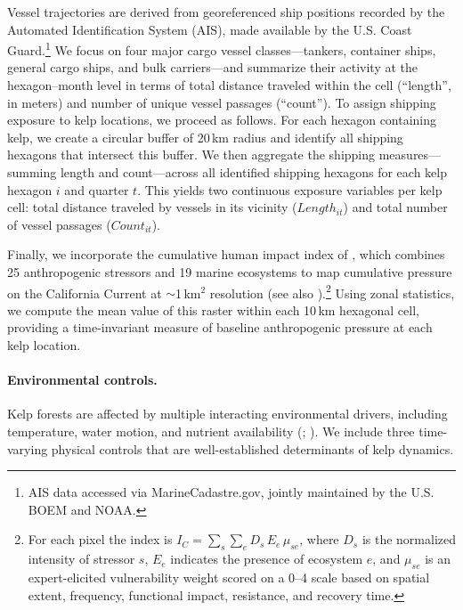 \documentclass[12pt]{article}
\begin{document}
Vessel trajectories are derived from georeferenced ship positions recorded by the Automated Identification System (AIS), made available by the U.S. Coast Guard.\footnote{AIS data accessed via MarineCadastre.gov, jointly maintained by the U.S. BOEM and NOAA.} We focus on four major cargo vessel classes---tankers, container ships, general cargo ships, and bulk carriers---and summarize their activity at the hexagon--month level in terms of total distance traveled within the cell (``length'', in meters) and number of unique vessel passages (``count''). To assign shipping exposure to kelp locations, we proceed as follows. For each hexagon containing kelp, we create a circular buffer of 20\,km radius and identify all shipping hexagons that intersect this buffer. We then aggregate the shipping measures---summing length and count---across all identified shipping hexagons for each kelp hexagon $i$ and quarter $t$. This yields two continuous exposure variables per kelp cell: total distance traveled by vessels in its vicinity ($Length_{it}$) and total number of vessel passages ($Count_{it}$).

Finally, we incorporate the cumulative human impact index of \citet{Halpern2009}, which combines 25 anthropogenic stressors and 19 marine ecosystems to map cumulative pressure on the California Current at ${\sim}$1\,km$^{2}$ resolution (see also \citealp{Maxwell2013}).\footnote{For each pixel the index is $I_{C}=\sum_{s}\sum_{e}D_{s}\,E_{e}\,\mu_{se}$, where $D_{s}$ is the normalized intensity of stressor $s$, $E_{e}$ indicates the presence of ecosystem $e$, and $\mu_{se}$ is an expert-elicited vulnerability weight scored on a 0--4 scale based on spatial extent, frequency, functional impact, resistance, and recovery time.} Using zonal statistics, we compute the mean value of this raster within each 10\,km hexagonal cell, providing a time-invariant measure of baseline anthropogenic pressure at each kelp location.

\paragraph{Environmental controls.}
Kelp forests are affected by multiple interacting environmental drivers, including temperature, water motion, and nutrient availability (\citealp{Carr2019}; \citealp{Castorani2022}). We include three time-varying physical controls that are well-established determinants of kelp dynamics.
\end{document}

